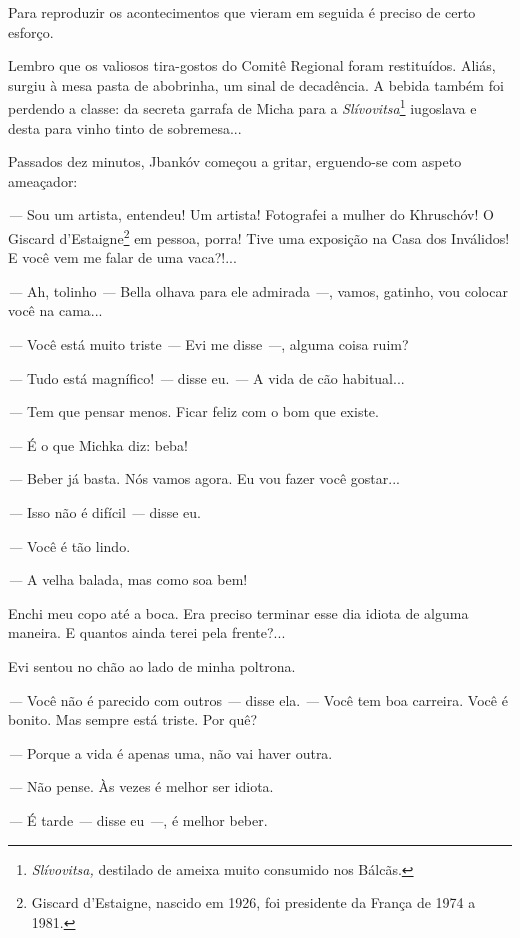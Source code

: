 Para reproduzir os acontecimentos que vieram em seguida é preciso de
certo esforço.

Lembro que os valiosos tira-gostos do Comitê Regional foram restituídos.
Aliás, surgiu à mesa pasta de abobrinha, um sinal de decadência. A
bebida também foi perdendo a classe: da secreta garrafa de Micha para a
\emph{Slívovitsa}\footnote{\emph{Slívovitsa,} destilado de ameixa muito
  consumido nos Bálcãs.} iugoslava e desta para vinho tinto de
sobremesa...

Passados dez minutos, Jbankóv começou a gritar, erguendo-se com aspeto
ameaçador:

\emph{---} Sou um artista, entendeu! Um artista! Fotografei a mulher do
Khruschóv! O Giscard d'Estaigne\footnote{Giscard d'Estaigne, nascido em
  1926, foi presidente da França de 1974 a 1981.} em pessoa, porra! Tive
uma exposição na Casa dos Inválidos! E você vem me falar de uma
vaca?!...

\emph{---} Ah, tolinho \emph{---} Bella olhava para ele admirada
\emph{---}, vamos, gatinho, vou colocar você na cama...

\emph{---} Você está muito triste \emph{---} Evi me disse \emph{---},
alguma coisa ruim?

\emph{---} Tudo está magnífico! \emph{---} disse eu. \emph{---} A vida
de cão habitual...

\emph{---} Tem que pensar menos. Ficar feliz com o bom que existe.

\emph{---} É o que Michka diz: beba!

\emph{---} Beber já basta. Nós vamos agora. Eu vou fazer você gostar...

\emph{---} Isso não é difícil \emph{---} disse eu.

\emph{---} Você é tão lindo.

\emph{---} A velha balada, mas como soa bem!

Enchi meu copo até a boca. Era preciso terminar esse dia idiota de
alguma maneira. E quantos ainda terei pela frente?...

Evi sentou no chão ao lado de minha poltrona.

\emph{---} Você não é parecido com outros \emph{---} disse ela.
\emph{---} Você tem boa carreira. Você é bonito. Mas sempre está triste.
Por quê?

\emph{---} Porque a vida é apenas uma, não vai haver outra.

\emph{---} Não pense. Às vezes é melhor ser idiota.

\emph{---} É tarde \emph{---} disse eu \emph{---}, é melhor beber.

